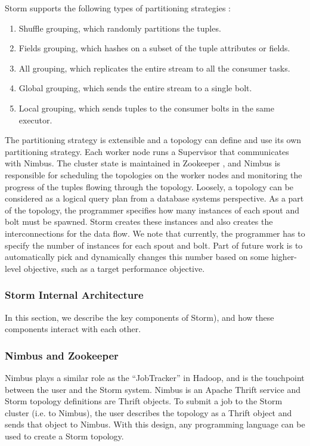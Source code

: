 \documentclass[9pt,twocolumn,twoside]{../../styles/osajnl}
\begin{document}
Storm supports the following types of partitioning strategies \cite{storm}:

\begin{enumerate}  
\item Shuffle grouping, which randomly partitions the tuples.
\item Fields grouping, which hashes on a subset of the tuple
  attributes or fields.
\item All grouping, which replicates the entire stream to all the
  consumer tasks.
\item Global grouping, which sends the entire stream to a single bolt.
\item Local grouping, which sends tuples to the consumer bolts in the
  same executor.
  
\end{enumerate}
The partitioning strategy is extensible and a topology can define and
use its own partitioning strategy.  Each worker node runs a Supervisor
that communicates with Nimbus.  The cluster state is maintained in
Zookeeper \cite{www-zookeeper}, and Nimbus is responsible for scheduling
the topologies on the worker nodes and monitoring the progress of the
tuples flowing through the topology. Loosely, a topology can be
considered as a logical query plan from a database systems
perspective. As a part of the topology, the programmer specifies how
many instances of each spout and bolt must be spawned. Storm creates
these instances and also creates the interconnections for the data
flow. We note that currently, the programmer has to specify the number
of instances for each spout and bolt. Part of future work is to
automatically pick and dynamically changes this number based on some
higher-level objective, such as a target performance objective.

\subsubsection{Storm Internal Architecture}

In this section, we describe the key components of Storm), and how
these components interact with each other.

\subsubsection{Nimbus and Zookeeper}

Nimbus plays a similar role as the “JobTracker” in Hadoop, and is the
touchpoint between the user and the Storm system. Nimbus is an Apache
Thrift service and Storm topology definitions are Thrift objects.  To
submit a job to the Storm cluster (i.e. to Nimbus), the user describes
the topology as a Thrift object and sends that object to Nimbus. With
this design, any programming language can be used to create a Storm
topology.
\end{document}
